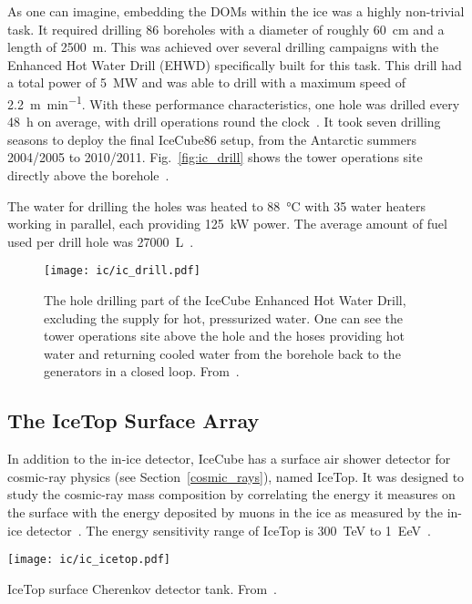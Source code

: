 As one can imagine, embedding the DOMs within the ice was a highly non-trivial task. It required drilling 86 boreholes with a diameter of roughly \SI{60}{\cm} and a length of \SI{2500}{\m}. This was achieved over several drilling campaigns with the Enhanced Hot Water Drill (EHWD) specifically built for this task. This drill had a total power of \SI{5}{\mega\W} and was able to drill with a maximum speed of \SI{2.2}{\meter\per\minute}. With these performance characteristics, one hole was drilled every \SI{48}{\hour} on average, with drill operations round the clock~\cite{Aartsen2017}. It took seven drilling seasons to deploy the final IceCube86 setup, from the Antarctic summers 2004/2005 to 2010/2011. Fig.~\ref{fig:ic_drill} shows the tower operations site directly above the borehole~.

The water for drilling the holes was heated to \SI{88}{\celsius} with 35 water heaters working in parallel, each providing \SI{125}{\kilo\W} power. The average amount of fuel used per drill hole was \SI{27000}{\liter}~\cite{Benson2014}.

\begin{figure}[hbtp]
    \texttt{[image: ic/ic\_drill.pdf]}
    \caption[IceCube enhanced hot water drill]{The hole drilling part of the IceCube Enhanced Hot Water Drill, excluding the supply for hot, pressurized water. One can see the tower operations site above the hole and the hoses providing hot water and returning cooled water from the borehole back to the generators in a closed loop. From~\cite{Benson2014}.}
\end{figure}

\subsection{The IceTop Surface Array}
In addition to the in-ice detector, IceCube has a surface air shower detector for cosmic-ray physics (see Section~\ref{cosmic_rays}), named IceTop. It was designed to study the cosmic-ray mass composition by correlating the energy it measures on the surface with the energy deposited by muons in the ice as measured by the in-ice detector~. The energy sensitivity range of IceTop is \SI{300}{\tera\eV} to \SI{1}{\exa\eV}~.

\begin{marginfigure}
    \texttt{[image: ic/ic\_icetop.pdf]}
    \caption[IceTop detector]{IceTop surface Cherenkov detector tank. From~\cite{Abbasi2013}.}
\end{marginfigure}

